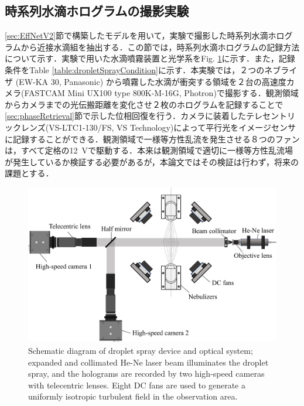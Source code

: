 \subsection{時系列水滴ホログラムの撮影実験}
\ref{sec:EffNetV2}節で構築したモデルを用いて，実験で撮影した時系列水滴ホログラムから近接水滴組を抽出する．この節では，時系列水滴ホログラムの記録方法について示す．実験で用いた水滴噴霧装置と光学系をFig. \ref{fig:dropletSpray}に示す．また，記録条件をTable \ref{table:dropletSprayCondition}に示す．本実験では，２つのネブライザ (EW-KA 30, Panasonic) から噴霧した水滴が衝突する領域を２台の高速度カメラ(FASTCAM Mini UX100 type 800K-M-16G, Photron)で撮影する．観測領域からカメラまでの光伝搬距離を変化させ２枚のホログラムを記録することで\ref{sec:phaseRetrieval}節で示した位相回復を行う．カメラに装着したテレセントリックレンズ(VS-LTC1-130/FS, VS Technology)によって平行光をイメージセンサに記録することができる．観測領域で一様等方性乱流を発生させる８つのファンは，すべて定格の\SI{12}{\V}で駆動する．本来は観測領域で適切に一様等方性乱流場が発生しているか検証する必要があるが，本論文ではその検証は行わず，将来の課題とする．

\begin{figure}[H]
    \centering
    \includegraphics[width=0.8\linewidth]{./Figure/3_Methods/dropletspraysystem.pdf}
    \caption{Schematic diagram of droplet spray device and optical system; expanded and collimated He-Ne laser beam illuminates the droplet spray, and the holograms are recorded by two high-speed cameras with telecentric lenses. Eight DC fans are used to generate a uniformly isotropic turbulent field in the observation area.}
    \label{fig:dropletSpray}
\end{figure}

